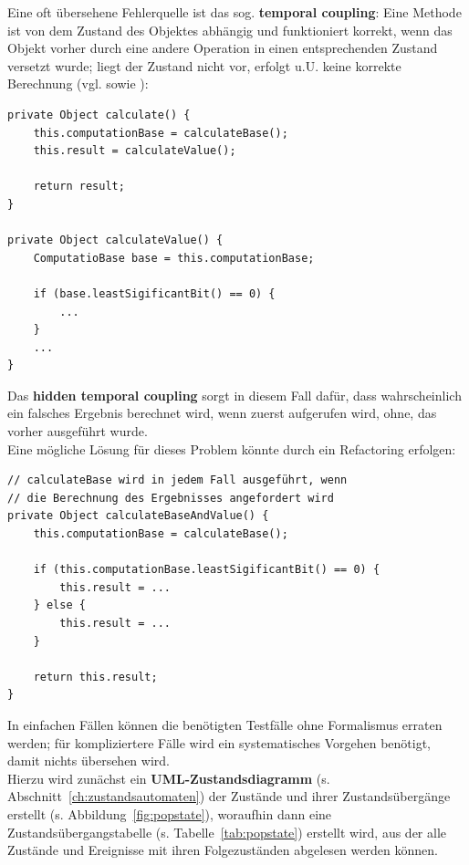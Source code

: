 \begin{tcolorbox}[colback=white]
    Eine oft übersehene Fehlerquelle ist das sog. \textbf{temporal coupling}: Eine Methode ist von dem Zustand des Objektes abhängig und funktioniert korrekt, wenn das Objekt vorher durch eine andere Operation in einen entsprechenden Zustand versetzt wurde; liegt der Zustand nicht vor, erfolgt u.U. keine korrekte Berechnung (vgl.\cite[44 f.]{Mar08} sowie \cite[259]{Mar08}):

    \begin{verbatim}
private Object calculate() {
    this.computationBase = calculateBase();
    this.result = calculateValue();

    return result;
}

private Object calculateValue() {
    ComputatioBase base = this.computationBase;

    if (base.leastSigificantBit() == 0) {
        ...
    }
    ...
}
    \end{verbatim}

    \noindent
    Das \textbf{hidden temporal coupling} sorgt in diesem Fall dafür, dass wahrscheinlich ein falsches Ergebnis berechnet wird, wenn zuerst  aufgerufen wird, ohne, das vorher  ausgeführt wurde.\\

     \noindent
     Eine mögliche Lösung für dieses Problem könnte durch ein Refactoring erfolgen:
    \begin{verbatim}
// calculateBase wird in jedem Fall ausgeführt, wenn
// die Berechnung des Ergebnisses angefordert wird
private Object calculateBaseAndValue() {
    this.computationBase = calculateBase();

    if (this.computationBase.leastSigificantBit() == 0) {
        this.result = ...
    } else {
        this.result = ...
    }

    return this.result;
}
    \end{verbatim}
\end{tcolorbox}


\noindent
In einfachen Fällen können die benötigten Testfälle ohne Formalismus erraten werden; für kompliziertere Fälle wird ein systematisches Vorgehen benötigt, damit nichts übersehen wird.\\
Hierzu wird zunächst ein \textbf{UML-Zustandsdiagramm} (s. Abschnitt~\ref{ch:zustandsautomaten}) der Zustände und ihrer Zustandsübergänge erstellt (s. Abbildung~\ref{fig:popstate}), woraufhin dann eine Zustandsübergangstabelle (s. Tabelle~\ref{tab:popstate}) erstellt wird, aus der alle Zustände und Ereignisse mit ihren Folgezuständen abgelesen werden können.

